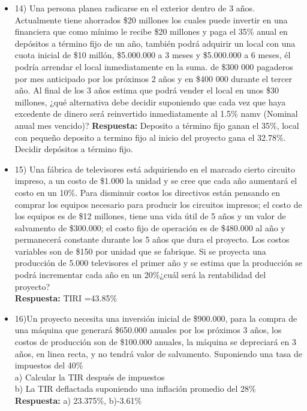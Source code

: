 \begin{itemize}
	\item 14) Una persona planea radicarse en el exterior dentro de 3 años. Actualmente tiene ahorrados \$20 millones los cuales puede invertir en una financiera que como mínimo le recibe \$20 millones y paga el 35\% anual en depósitos a término fijo de un año, también podrá adquirir un local con una cuota inicial de \$10 millón, \$5.000.000 a 3 meses y \$5.000.000 a 6 meses, él podría arrendar el local inmediatamente en la suma. de \$300 000 pagaderos por mes anticipado por los próximos 2 años y en \$400 000 durante el tercer año. Al final de los 3 años estima que podrá vender el local en unos \$30 millones, ¿qué alternativa debe decidir suponiendo que cada vez que haya excedente de dinero será reinvertido inmediatamente al 1.5\% namv (Nominal anual mes vencido)?
	      \textbf{ Respuesta:} Deposito a término fijo ganan el 35\%, local con pequeño deposito a termino fijo al inicio del proyecto gana el 32.78\%. Decidir depósitos a término fijo.
	      
	      
	\item 15)	Una fábrica de televisores está adquiriendo en el marcado cierto circuito impreso, a un costo de \$1.000 la unidad y se cree que cada año aumentará el costo en un 10\%. Para disminuir costos los directivos están pensando en comprar los equipos necesario para producir los circuitos impresos; el costo de los equipos es de \$12 millones, tiene una vida útil de 5 años y un valor de salvamento de \$300.000; el costo fijo de operación es de \$480.000 al año y permanecerá constante durante los 5 años que dura el proyecto. Los costos variables son de \$150 por unidad que se fabrique. Si se proyecta una producción de 5.000 televisores el primer año y se estima que la producción se podrá incrementar cada año en un 20\%¿cuál será la rentabilidad del proyecto?\\
	      \textbf{Respuesta:} TIRI =43.85\%
	      \medskip
	      
	\item 16)Un proyecto necesita una inversión inicial de \$900.000, para la compra de una máquina que generará \$650.000 anuales por los próximos 3 años, los costos de producción son de \$100.000 anuales, la máquina se depreciará en 3 años, en linea recta, y no tendrá valor de salvamento. Suponiendo una tasa de impuestos del 40\%\\
	      a) Calcular la TIR después de impuestos\\
	      b) La TIR deflactada suponiendo una inflación promedio del 28\%\\
	      \textbf{ Respuesta:} a) 23.375\%, b)-3.61\%
	      \medskip
	      

\end{itemize}
